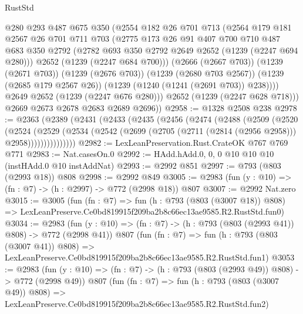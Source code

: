 \begin{lexlean}{RustStd}
\begin{coremodule}
            @280
            @293
            @487
            @675
            @350
            (@2554
              @182
              @26
              @701
              @713
              (@2564
                @179
                @181
                @2567
                @26
                @701
                @711
                @703
                (@2775
                  @173
                  @26
                  @91
                  @407
                  @700
                  @710
                  @487
                  @683
                  @350
                  @2792
                  (@2782 @693 @350 @2792 @2649 @2652 (@1239 (@2247 @694 @280)))
                  @2652
                  (@1239 (@2247 @684 @700)))
                (@2666 (@2667 @703))
                (@1239 (@2671 @703))
                (@1239 (@2676 @703))
                (@1239 (@2680 @703 @2567))
                (@1239 (@2685 @179 @2567 @26))
                (@1239 (@1240 (@1241 (@2691 @703)) @238))))
            @2649
            @2652
            (@1239 (@2247 @676 @280)))
          @2652
          (@1239 (@2247 @628 @718)))
        @2669
        @2673
        @2678
        @2683
        @2689
        @2696))
@2958 := @1328 @2508 @238
@2978 := @2363
    (@2389
      (@2431
        (@2433
          (@2435
            (@2456
              (@2474
                (@2488
                  (@2509
                    (@2520
                      (@2524
                        (@2529
                          (@2534
                            (@2542 (@2699 (@2705 (@2711 (@2814 (@2956 @2958))) @2958)))))))))))))))
@2982 := LexLeanPreservation.Rust.CrateOK @767 @769 @771
@2983 := Nat.casesOn.{0}
@2992 := HAdd.hAdd.{0, 0, 0} @10 @10 @10 (instHAdd.{0} @10 instAddNat)
@2993 := @2992 @851
@2997 := @793 (@803 (@2993 @18)) @808
@2998 := @2992 @849
@3005 := @2983 (fun (y : @10) => (fn : @7) -> (h : @2997) -> @772 (@2998 @18)) @807
@3007 := @2992 Nat.zero
@3015 := @3005
    (fun (fn : @7) =>
    fun (h : @793 (@803 (@3007 @18)) @808) =>
    LexLeanPreserve.Ce0bd819915f209ba2b8c66ec13ae9585.R2.RustStd.fun0)
@3034 := @2983
    (fun (y : @10) => (fn : @7) -> (h : @793 (@803 (@2993 @41)) @808) -> @772 (@2998 @41))
    @807
    (fun (fn : @7) =>
    fun (h : @793 (@803 (@3007 @41)) @808) =>
    LexLeanPreserve.Ce0bd819915f209ba2b8c66ec13ae9585.R2.RustStd.fun1)
@3053 := @2983
    (fun (y : @10) => (fn : @7) -> (h : @793 (@803 (@2993 @49)) @808) -> @772 (@2998 @49))
    @807
    (fun (fn : @7) =>
    fun (h : @793 (@803 (@3007 @49)) @808) =>
    LexLeanPreserve.Ce0bd819915f209ba2b8c66ec13ae9585.R2.RustStd.fun2)

\end{coremodule}
\end{lexlean}
